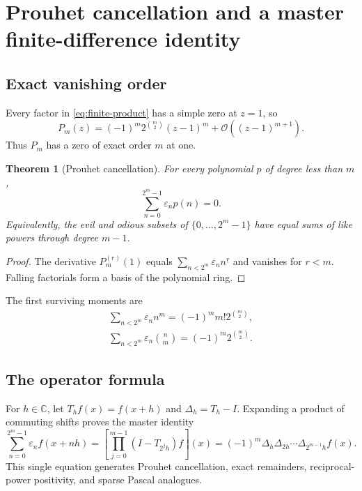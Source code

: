 \documentclass[11pt,oneside]{article}
\numberwithin{equation}{section}
\newtheorem{theorem}{Theorem}[section]
\theoremstyle{definition}
\theoremstyle{remark}
\newcommand{\C}{\mathbb C}
\newcommand{\eps}{\varepsilon}
\newcommand{\fall}[2]{#1^{\underline{#2}}}
\newcommand{\bigO}{\mathcal O}
\begin{document}
\section{Prouhet cancellation and a master finite-difference identity}
\label{sec:prouhet}

\subsection{Exact vanishing order}

Every factor in \eqref{eq:finite-product} has a simple zero at \(z=1\), so
\begin{equation}
 P_m(z)=(-1)^m2^{\binom m2}(z-1)^m+\bigO((z-1)^{m+1}).
 \label{eq:Pm-local}
\end{equation}
Thus \(P_m\) has a zero of exact order \(m\) at one.

\begin{theorem}[Prouhet cancellation]
For every polynomial \(p\) of degree less than \(m\),
\begin{equation}
 \boxed{\sum_{n=0}^{2^m-1}\eps_np(n)=0.}
 \label{eq:prouhet}
\end{equation}
Equivalently, the evil and odious subsets of \(\{0,\ldots,2^m-1\}\) have
equal sums of like powers through degree \(m-1\).
\end{theorem}

\begin{proof}
The derivative \(P_m^{(r)}(1)\) equals
\(\sum_{n<2^m}\eps_n\fall{n}{r}\) and vanishes for \(r<m\).
Falling factorials form a basis of the polynomial ring.
\end{proof}

The first surviving moments are
\begin{align}
 \boxed{\sum_{n<2^m}\eps_nn^m
   =(-1)^m m!2^{\binom m2},}
 \label{eq:first-power-moment}\\
 \boxed{\sum_{n<2^m}\eps_n\binom nm
   =(-1)^m2^{\binom m2}.}
 \label{eq:first-binomial-moment}
\end{align}

\subsection{The operator formula}

For \(h\in\C\), let \(T_hf(x)=f(x+h)\) and
\(\Delta_h=T_h-I\).  Expanding a product of commuting shifts proves the
master identity
\begin{equation}
 \boxed{\sum_{n=0}^{2^m-1}\eps_nf(x+nh)
 =\left[\prod_{j=0}^{m-1}(I-T_{2^jh})f\right](x)
 =(-1)^m\Delta_h\Delta_{2h}\cdots\Delta_{2^{m-1}h}f(x).}
 \label{eq:finite-difference-master}
\end{equation}
This single equation generates Prouhet cancellation, exact remainders,
reciprocal-power positivity, and sparse Pascal analogues.
\end{document}
